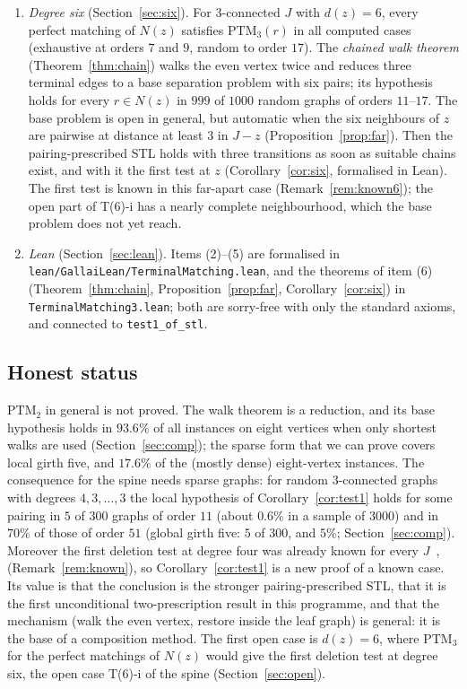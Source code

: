 \documentclass[11pt]{amsart}
\theoremstyle{definition}
\newcommand{\PTM}{\mathrm{PTM}}
\begin{document}
\begin{enumerate}[label=(\arabic*)]
prescribed transitions is, and so is the route to it.
\item \emph{Degree six} (Section~\ref{sec:six}). For $3$-connected $J$ with $d(z)=6$, every
perfect matching of $N(z)$ satisfies $\PTM_3(r)$ in all computed cases (exhaustive at orders $7$
and $9$, random to order $17$). The \emph{chained walk theorem} (Theorem~\ref{thm:chain}) walks
the even vertex twice and reduces three terminal edges to a base separation problem with six
pairs; its hypothesis holds for every $r\in N(z)$ in $999$ of $1000$ random graphs of orders
$11$--$17$. The base problem is open in general, but automatic when the six neighbours of $z$ are
pairwise at distance at least $3$ in $J-z$ (Proposition~\ref{prop:far}). Then the
pairing-prescribed STL holds with three transitions as soon as suitable chains exist, and with
it the first test at $z$ (Corollary~\ref{cor:six}, formalised in Lean). The first test is known in
this far-apart case (Remark~\ref{rem:known6}); the open part of T(6)-i has a nearly complete
neighbourhood, which the base problem does not yet reach.
\item \emph{Lean} (Section~\ref{sec:lean}). Items (2)--(5) are formalised in
\texttt{lean/GallaiLean/TerminalMatching.lean}, and the theorems of item (6) (Theorem~\ref{thm:chain},
Proposition~\ref{prop:far}, Corollary~\ref{cor:six}) in \texttt{TerminalMatching3.lean}; both are
sorry-free with only the standard axioms, and connected to \texttt{test1\_of\_stl}.
\end{enumerate}

\subsection*{Honest status}
$\PTM_2$ in general is not proved. The walk theorem is a reduction, and its base hypothesis holds
in $93.6\%$ of all instances on eight vertices when only shortest walks are used
(Section~\ref{sec:comp}); the sparse form that we can prove covers local girth five, and
$17.6\%$ of the (mostly dense) eight-vertex instances. The consequence for the spine needs sparse
graphs: for random $3$-connected graphs with degrees $4,3,\dots,3$ the local hypothesis of
Corollary~\ref{cor:test1} holds for some pairing in $5$ of $300$ graphs of order $11$ (about
$0.6\%$ in a sample of $3000$) and in $70\%$ of those of order $51$ (global girth five: $5$ of
$300$, and $5\%$; Section~\ref{sec:comp}). Moreover the first deletion test at degree four
was already known for every $J$~\cite[Corollary~22]{ES},~\cite[Theorem~13]{BS}
(Remark~\ref{rem:known}), so Corollary~\ref{cor:test1} is a new proof of a known case. Its value
is that the conclusion is the stronger pairing-prescribed STL, that it is the first unconditional
two-prescription result in this programme, and that the mechanism (walk the even vertex, restore
inside the leaf graph) is general: it is the base of a composition method. The first open case
is $d(z)=6$, where $\PTM_3$ for the perfect matchings of $N(z)$ would give the first deletion
test at degree six, the open case T(6)-i of the spine (Section~\ref{sec:open}).
\end{document}
